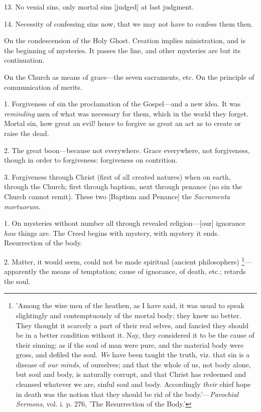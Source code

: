13. No venial sins, only mortal sins [judged] at
last judgment.

14. Necessity of confessing sins now, that we may
not have to confess them then.


On the condescension of the Holy Ghost. Creation
implies ministration, and is the beginning of mysteries. It passes the
line, and other mysteries are but its continuation.


On the Church as means of grace—the seven
sacraments, etc. On the principle of communication of merits.


1. Forgiveness of sin the proclamation of the
Gospel—and a new idea. It was \emph{reminding} men of what was
necessary for them, which in the world they forget. Mortal sin, how
great an evil! hence to forgive as great an act as to create or raise
the dead.

2. The great boon—because not everywhere. Grace
everywhere, not forgiveness, though in order to forgiveness:
forgiveness on contrition.

3. Forgiveness through Christ (first of all
created natures) when on earth, through the Church; first
through baptism, next through penance (no sin the Church cannot
remit). These two [Baptism and Penance] the \emph{Sacramenta mortuorum}.


1. On mysteries without number all through
revealed religion—[our] ignorance \emph{how} things are. The Creed
begins with mystery, with mystery it ends. Resurrection of the body.

2. Matter, it would seem, could not be made
spiritual (ancient philosophers) \footnote{'Among the wise men of
the heathen, as I have said, it was usual to speak slightingly and
contemptuously of the mortal body; they knew no better. They thought
it scarcely a part of their real selves, and fancied they should be in
a better condition without it. Nay, they considered it to be the cause
of their sinning; as if the soul of man were pure, and the material
body were gross, and defiled the soul. \emph{We} have been taught the
truth, viz. that sin is a disease of \emph{our minds}, of ourselves;
and that the whole of us, not body alone, but soul and body, is
naturally corrupt, and that Christ has redeemed and cleansed whatever
we are, sinful soul and body. Accordingly \emph{their} chief hope in
death was the notion that they should be rid of the body.'—\emph{Parochial
Sermons}, vol. i. p. 276, 'The Resurrection of the Body.'}—apparently the means of temptation; cause of ignorance, of
death, etc.; retards the soul.

